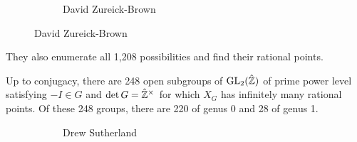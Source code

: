 \begin{frame}[plain]
\begin{figure}[h]
\begin{subfigure}{0.3\textwidth}
	\caption{David Zureick-Brown}
	\end{subfigure}
	\end{figure}
\begin{rem}
They also enumerate all 1,208 possibilities and find their rational points. 
\end{rem}
\end{frame}



\begin{frame}[plain]
\begin{thm}
Up to conjugacy, there are 248 open subgroups of $\operatorname{GL}_2(\hat{\mathbb{Z}})$ of prime power level satisfying $-I \in G$ and $\det G= \hat{\mathbb{Z}}^\times$ for which $X_G$ has infinitely many rational points. Of these 248 groups, there are 220 of genus 0 and 28 of genus 1. 
\end{thm}
	\begin{figure}[h]
	\centering
	\begin{subfigure}{0.3\textwidth}
	\captionsetup{labelformat=empty}
	\centering
	\caption{Drew Sutherland}
	\end{subfigure}
	\begin{subfigure}{0.3\textwidth}
	\captionsetup{labelformat=empty}
	\centering

\end{subfigure}
\end{figure}
\end{frame}
